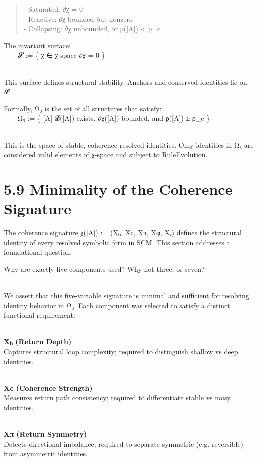 \begin{quote}
- Saturated: ∂χ = 0\\
- Reactive: ∂χ bounded but nonzero\\
- Collapsing: ∂χ unbounded, or ρ({[}A{]}) \textless{} ρ\_c
\end{quote}

The invariant surface:\\
  𝓢 := \{ χ ∈ χ-space \textbar{} ∂χ = 0 \}\\
\strut \\
This surface defines structural stability. Anchors and conserved
identities lie on 𝓢.

Formally, Ω₃ is the set of all structures that satisfy:\\
  Ω₃ := \{ {[}A{]} \textbar{} 𝓛({[}A{]}) exists, ∂χ({[}A{]}) bounded,
and ρ({[}A{]}) ≥ ρ\_c \}\\
\strut \\
This is the space of stable, coherence-resolved identities. Only
identities in Ω₃ are considered valid elements of χ-space and subject to
RuleEvolution.

\section{5.9 \textbar{} Minimality of the Coherence
Signature}\label{minimality-of-the-coherence-signature}

The coherence signature χ({[}A{]}) := (Xₕ, Xc, Xπ, Xφ, Xₑ) defines the
structural identity of every resolved symbolic form in SCM. This section
addresses a foundational question:

Why are exactly five components used? Why not three, or seven?\\
\strut \\
We assert that this five-variable signature is minimal and sufficient
for resolving identity behavior in Ω₃. Each component was selected to
satisfy a distinct functional requirement:\\
\strut \\
\textbf{Xₕ (Return Depth)}\\
Captures structural loop complexity; required to distinguish shallow vs
deep identities.\\
\strut \\
\textbf{Xc (Coherence Strength)}\\
Measures return path consistency; required to differentiate stable vs
noisy identities.\\
\strut \\
\textbf{Xπ (Return Symmetry)}\\
Detects directional imbalance; required to separate symmetric (e.g.
reversible) from asymmetric identities.

